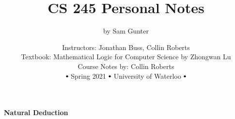 \documentclass[11pt,notitlepage]{report}
\makeatletter
\newcommand{\tbf}[1]{\textbf{#1}}
\newcommand\sbullet[1][.75]{\mathbin{\vcenter{\hbox{\scalebox{#1}{$\bullet$}}}}}
\newcommand*{\toccontents}{\@starttoc{toc}}
\makeatother
\begin{document}
\parindent=0pt

\title{\vspace{-15mm}CS 245 Personal Notes \vspace{-5mm}}
\author{by Sam Gunter}
\date{Instructors: Jonathan Buss, Collin Roberts\\ 
Textbook: Mathematical Logic for Computer Science by Zhongwan Lu\\
Course Notes by: Collin Roberts\\
$\sbullet$ Spring 2021 $\sbullet$ University of Waterloo $\sbullet$}
\maketitle

\toccontents

\thispagestyle{empty}
\newpage
\setcounter{page}{1}
\tbf{Natural Deduction}
\vspace{-2mm}
\end{document}

